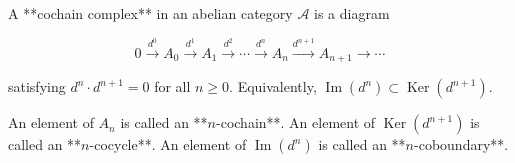 A **cochain complex** in an abelian category $\mathcal{A}$ is a diagram

$$0 \xrightarrow{d^0} A_0 \xrightarrow{d^1} A_1 \xrightarrow{d^2} \cdots \xrightarrow{d^n} A_n \xrightarrow{d^{n+1}} A_{n+1} \rightarrow \cdots$$

satisfying $d^n \cdot d^{n+1} = 0$ for all $n \geq 0$. Equivalently, $\operatorname{Im}(d^n) \subset \operatorname{Ker}(d^{n+1})$.

An element of $A_n$ is called an **$n$-cochain**. An element of $\operatorname{Ker}(d^{n+1})$ is called an **$n$-cocycle**. An element of $\operatorname{Im}(d^n)$ is called an **$n$-coboundary**.
